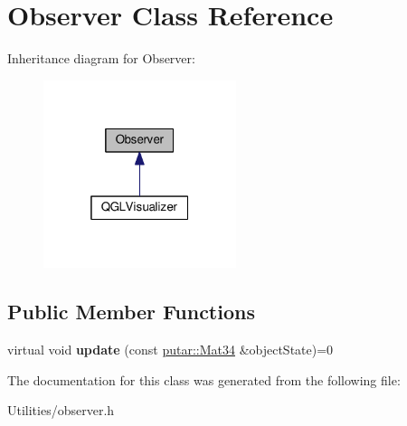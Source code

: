 \hypertarget{classObserver}{}\section{Observer Class Reference}
\label{classObserver}


Inheritance diagram for Observer\+:
\nopagebreak
\begin{figure}[H]
\begin{center}
\leavevmode
\includegraphics[width=160pt]{classObserver__inherit__graph}
\end{center}
\end{figure}
\subsection*{Public Member Functions}
\begin{DoxyCompactItemize}
\item 
virtual void {\bfseries update} (const \hyperlink{namespaceputar_a8bf3c8025ae8f60f553a752014c9849a}{putar\+::\+Mat34} \&object\+State)=0\hypertarget{classObserver_af8585a590e41dbffa1e53c7c98abe570}{}\label{classObserver_af8585a590e41dbffa1e53c7c98abe570}

\end{DoxyCompactItemize}


The documentation for this class was generated from the following file\+:\begin{DoxyCompactItemize}
\item 
Utilities/observer.\+h\end{DoxyCompactItemize}

